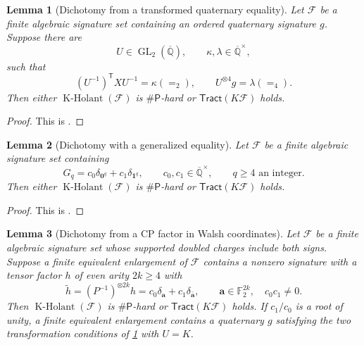\documentclass[11pt,letterpaper,onecolumn]{article}
\theoremstyle{plain}
\newtheorem{lemma}[lemma]{Lemma}
\theoremstyle{definition}
\theoremstyle{remark}
\newcommand{\AlgNums}{\overline{\mathbb Q}}
\newcommand{\Ftwo}{\mathbb F_2}
\newcommand{\cF}{\mathcal F}
\newcommand{\KHolant}{\operatorname{K\text{-}Holant}}
\newcommand{\Tract}{\mathsf{Tract}}
\newcommand{\SharpP}{\#\mathsf P}
\newcommand{\GL}{\operatorname{GL}}
\newcommand{\Eq}{=}
\newcommand{\one}{\mathbf 1}
\newcommand{\zero}{\mathbf 0}
\begin{document}
	\begin{lemma}[Dichotomy from a transformed quaternary equality]
		\label{lem:equality-anchor}
		Let \(\cF\) be a finite algebraic signature set containing an ordered
		quaternary signature \(g\).  Suppose there are
		\[
		U\in\GL_2(\AlgNums),
		\qquad \kappa,\lambda\in\AlgNums^\times,
		\]
		such that
		\[
		(U^{-1})^{\mathsf T}XU^{-1}=\kappa(\Eq_2),
		\qquad
		U^{\otimes4}g=\lambda(\Eq_4).
		\]
		Then either \(\KHolant(\cF)\) is \(\SharpP\)-hard or
		\(\Tract(K\cF)\) holds.
	\end{lemma}
	
	\begin{proof} This is \cite[Lemma~3.8]{Liu2026DEQ2Holant}. \end{proof}

	
	\begin{lemma}[Dichotomy with a generalized equality]
		\label{lem:pure-ge}
		Let \(\cF\) be a finite algebraic signature set containing
		\[
		G_q=c_0\delta_{\zero^q}+c_1\delta_{\one^q},
		\qquad c_0,c_1\in\AlgNums^\times,\qquad q\ge4\text{ an integer}.
		\]
		Then either \(\KHolant(\cF)\) is \(\SharpP\)-hard or
		\(\Tract(K\cF)\) holds.
	\end{lemma}
	
	\begin{proof}
		This is \cite[Lemma~3.9]{Liu2026DEQ2Holant}.
	\end{proof}
	
	\begin{lemma}[Dichotomy from a CP factor in Walsh coordinates]
		\label{lem:walsh-ge-terminal}
		Let \(\cF\) be a finite algebraic signature set whose supported doubled
		charges include both signs.  Suppose a finite equivalent enlargement of
		\(\cF\) contains a nonzero signature with a tensor factor \(h\) of even
		arity \(2k\ge4\) with
		\[
		\widetilde h=(P^{-1})^{\otimes 2k}h
		=c_0\delta_{\mathbf a}+c_1\delta_{\bar {\mathbf a}},
		\qquad {\mathbf a}\in\Ftwo^{2k},\quad c_0c_1\ne0.
		\]
		Then \(\KHolant(\cF)\) is \(\SharpP\)-hard or \(\Tract(K\cF)\)
		holds.  If \(c_1/c_0\) is a root of unity, a finite equivalent enlargement
		contains a quaternary \(g\) satisfying the two transformation conditions of
		\cref{lem:equality-anchor} with \(U=K\).  
	\end{lemma}
	
\end{document}

